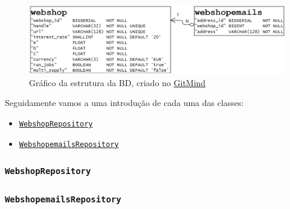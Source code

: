 \begin{figure}[!hbt]
        \centering
        \includegraphics[width=15cm]{figuras/db.png}
        \caption{Gráfico da estrutura da BD, criado no \href{https://gitmind.com/app/flowchart/51b11741757}{GitMind}}
        \label{fig:db}
\end{figure}
\FloatBarrier

Seguidamente vamos a uma introdução de cada uma das classes:
\begin{itemize}
        \item \hyperref[rep1]{\texttt{WebshopRepository}}
        \item \hyperref[rep2]{\texttt{WebshopemailsRepository}}
\end{itemize}

\newpage

\subsubsection*{\texttt{WebshopRepository}}\label{rep1}

\subsubsection*{\texttt{WebshopemailsRepository}}\label{rep2}

\newpage
